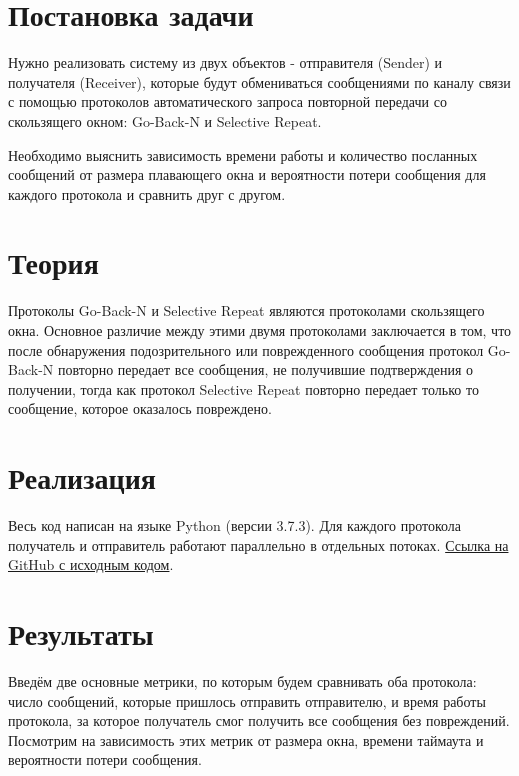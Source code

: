\documentclass[a4paper,12pt]{article}
\begin{document}
    
    \newpage

    \tableofcontents
    \listoffigures
    \newpage

    \section{Постановка задачи}
    \quad Нужно реализовать систему из двух объектов - отправителя (Sender) и получателя (Receiver),
    которые будут обмениваться сообщениями по каналу связи с помощью протоколов автоматического запроса повторной передачи
    со скользящего окном: Go-Back-N и Selective Repeat.

    Необходимо выяснить зависимость времени работы и количество посланных сообщений от размера плавающего окна 
    и вероятности потери сообщения для каждого протокола и сравнить друг с другом.

    \section{Теория} \label{s:theory}
    \quad Протоколы Go-Back-N и Selective Repeat являются протоколами скользящего окна.
    Основное различие между этими двумя протоколами заключается в том, что после обнаружения подозрительного или поврежденного сообщения
    протокол Go-Back-N повторно передает все сообщения, не получившие подтверждения о получении,
    тогда как протокол Selective Repeat повторно передает только то сообщение, которое оказалось повреждено.

    \section{Реализация}
    \quad Весь код написан на языке Python (версии 3.7.3).
    Для каждого протокола получатель и отправитель работают параллельно в отдельных потоках.
    \href{https://github.com/kirillkuks/Networks/tree/master/lab1}{Ссылка на GitHub с исходным кодом}.

    \section{Результаты}
    \quad Введём две основные метрики, по которым будем сравнивать оба протокола:
    число сообщений, которые пришлось отправить отправителю, 
    и время работы протокола, за которое получатель смог получить все сообщения без повреждений.
    Посмотрим на зависимость этих метрик от 
    размера окна, времени таймаута и вероятности потери сообщения.
    
\end{document}
